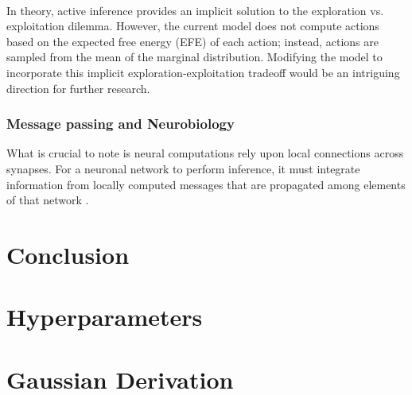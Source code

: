 \documentclass{article}
\begin{document}
\

In theory, active inference provides an implicit solution to the exploration vs. exploitation dilemma. However, the current model does not compute actions based on the expected free energy (EFE) of each action; instead, actions are sampled from the mean of the marginal distribution. Modifying the model to incorporate this implicit exploration-exploitation tradeoff would be an intriguing direction for further research.


\subsubsection{Message passing and Neurobiology}

What is crucial to note is neural computations rely upon local connections across synapses. For a neuronal network to perform inference, it must integrate information from locally computed messages that are propagated among elements of that network \citep{parr2019neuronal}. 


\section{Conclusion}

\newpage



\newpage

\appendix

\section{Hyperparameters}\label{appendix:hyperparameters}

\section{Gaussian Derivation}\label{appendix:laplace_approx}
\end{document}
